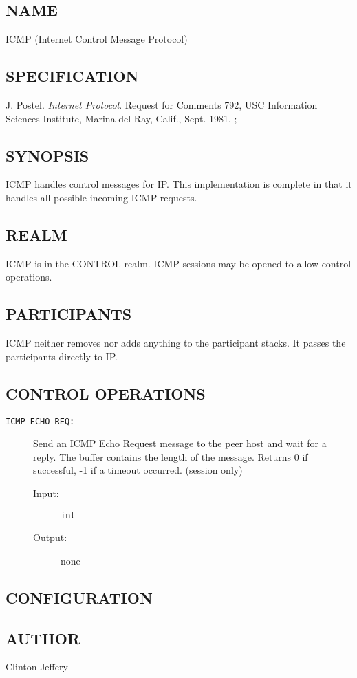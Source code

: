 %
%
%

\subsection*{NAME}

\noindent ICMP (Internet Control Message Protocol)

\subsection*{SPECIFICATION}

\noindent J. Postel. {\it Internet Protocol}. Request for Comments 
792, USC Information Sciences Institute, Marina del Ray, Calif., Sept. 1981.
;
\subsection*{SYNOPSIS}

\noindent ICMP handles control messages for IP. This implementation is
complete in that it handles all possible incoming ICMP requests.

\subsection*{REALM}

ICMP is in the CONTROL realm.  ICMP sessions may be opened to allow
control operations.

\subsection*{PARTICIPANTS}

ICMP neither removes nor adds anything to the participant stacks.  
It passes the participants directly to IP. 

\subsection*{CONTROL OPERATIONS}

\begin{description}

\item[{\tt ICMP\_ECHO\_REQ:}]
Send an ICMP Echo Request message to the peer host and wait for a
reply.  The buffer contains the length of the message.  Returns 0 if
successful, -1 if a timeout occurred.  (session only)
\begin{description}
\item[{\rm Input:}] {\tt int} 
\item[{\rm Output:}] none
\end{description}

\end{description}


\subsection*{CONFIGURATION}


\subsection*{AUTHOR}

\noindent Clinton Jeffery
